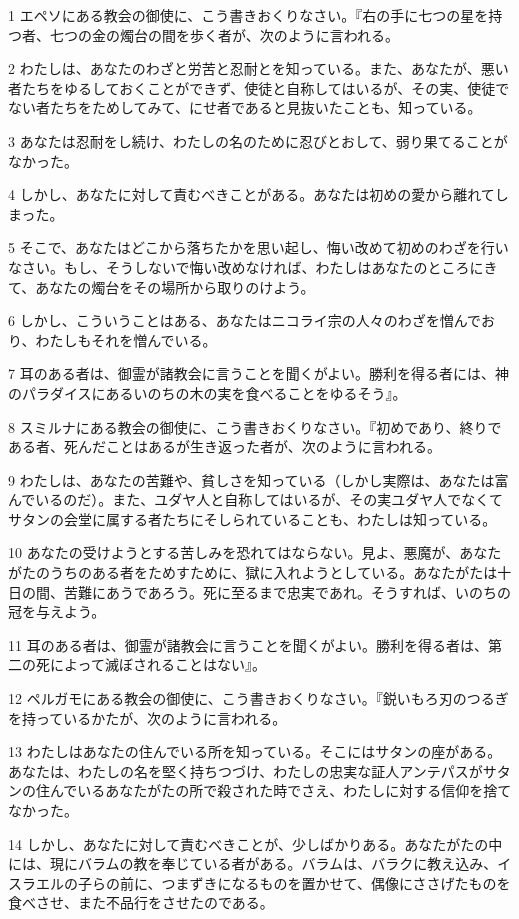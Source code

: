 \par 1 エペソにある教会の御使に、こう書きおくりなさい。『右の手に七つの星を持つ者、七つの金の燭台の間を歩く者が、次のように言われる。
\par 2 わたしは、あなたのわざと労苦と忍耐とを知っている。また、あなたが、悪い者たちをゆるしておくことができず、使徒と自称してはいるが、その実、使徒でない者たちをためしてみて、にせ者であると見抜いたことも、知っている。
\par 3 あなたは忍耐をし続け、わたしの名のために忍びとおして、弱り果てることがなかった。
\par 4 しかし、あなたに対して責むべきことがある。あなたは初めの愛から離れてしまった。
\par 5 そこで、あなたはどこから落ちたかを思い起し、悔い改めて初めのわざを行いなさい。もし、そうしないで悔い改めなければ、わたしはあなたのところにきて、あなたの燭台をその場所から取りのけよう。
\par 6 しかし、こういうことはある、あなたはニコライ宗の人々のわざを憎んでおり、わたしもそれを憎んでいる。
\par 7 耳のある者は、御霊が諸教会に言うことを聞くがよい。勝利を得る者には、神のパラダイスにあるいのちの木の実を食べることをゆるそう』。
\par 8 スミルナにある教会の御使に、こう書きおくりなさい。『初めであり、終りである者、死んだことはあるが生き返った者が、次のように言われる。
\par 9 わたしは、あなたの苦難や、貧しさを知っている（しかし実際は、あなたは富んでいるのだ）。また、ユダヤ人と自称してはいるが、その実ユダヤ人でなくてサタンの会堂に属する者たちにそしられていることも、わたしは知っている。
\par 10 あなたの受けようとする苦しみを恐れてはならない。見よ、悪魔が、あなたがたのうちのある者をためすために、獄に入れようとしている。あなたがたは十日の間、苦難にあうであろう。死に至るまで忠実であれ。そうすれば、いのちの冠を与えよう。
\par 11 耳のある者は、御霊が諸教会に言うことを聞くがよい。勝利を得る者は、第二の死によって滅ぼされることはない』。
\par 12 ペルガモにある教会の御使に、こう書きおくりなさい。『鋭いもろ刃のつるぎを持っているかたが、次のように言われる。
\par 13 わたしはあなたの住んでいる所を知っている。そこにはサタンの座がある。あなたは、わたしの名を堅く持ちつづけ、わたしの忠実な証人アンテパスがサタンの住んでいるあなたがたの所で殺された時でさえ、わたしに対する信仰を捨てなかった。
\par 14 しかし、あなたに対して責むべきことが、少しばかりある。あなたがたの中には、現にバラムの教を奉じている者がある。バラムは、バラクに教え込み、イスラエルの子らの前に、つまずきになるものを置かせて、偶像にささげたものを食べさせ、また不品行をさせたのである。
